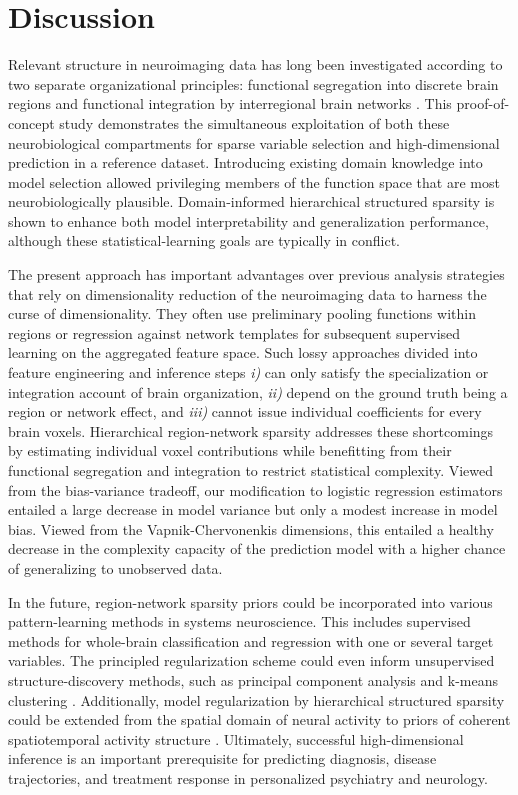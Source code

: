 \documentclass{article} %
\begin{document}
\section{Discussion}
Relevant structure in neuroimaging data has long been investigated
according to two separate organizational principles:
functional segregation into discrete brain regions
\cite{passingham2002}
and functional integration by interregional brain networks
\cite{sporns14nn}.
%
This proof-of-concept study demonstrates the simultaneous exploitation of
both these neurobiological compartments
for sparse variable selection and high-dimensional prediction
in a reference dataset.
%
Introducing existing domain knowledge into model selection
allowed privileging members of the function space
that are most neurobiologically plausible.
%
Domain-informed hierarchical structured sparsity is shown to enhance
both model interpretability and generalization performance,
although these statistical-learning goals are typically in conflict.



The present approach has important advantages over previous
analysis strategies that rely on dimensionality reduction of
the neuroimaging data to harness the curse of dimensionality.
They often use preliminary pooling functions within regions
or regression against network templates
for subsequent supervised learning on the aggregated feature space.
Such lossy approaches divided into feature engineering and inference steps
\textit{i)} can only satisfy the specialization or
integration account of brain organization,
\textit{ii)} depend on the ground truth being a region or network effect,
and
\textit{iii)} cannot issue individual coefficients for every brain voxels.
%
Hierarchical region-network sparsity addresses these shortcomings
by estimating individual voxel contributions
while benefitting from their functional segregation and integration
to restrict statistical complexity.
%
Viewed from the bias-variance tradeoff,
our modification to logistic regression estimators
entailed a large decrease in model variance but only a modest
increase in model bias.
Viewed from the Vapnik-Chervonenkis dimensions,
this entailed a healthy decrease in the complexity capacity of the prediction model
with a higher chance of generalizing to unobserved data.



In the future,
region-network sparsity priors could be incorporated into various
pattern-learning methods in systems neuroscience.
%
This includes supervised methods for whole-brain classification and regression
with one or several target variables.
The principled regularization scheme could even inform
unsupervised structure-discovery methods,
such as principal component analysis
\cite{jenatton2009structured}
and
k-means clustering \cite{witten2010framework}.
%
Additionally,
model regularization by hierarchical structured sparsity could be extended
from the spatial domain of neural activity to
priors of coherent spatiotemporal activity structure
\cite{gramfort2011tracking}.
%
Ultimately,
successful high-dimensional inference is
an important prerequisite
for predicting diagnosis,
disease trajectories, and treatment response
in personalized psychiatry and neurology.
\end{document}

